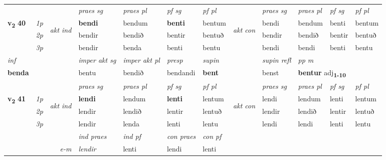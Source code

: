 \begin{longtable}[l]{X>{\footnotesize\itshape}llXXXXlXXXX}
 & &   & \textit{praes sg}  & \textit{praes pl}    & \textit{ pf sg} & \textit{pf pl} & & \textit{praes sg}  & \textit{praes pl}    & \textit{pf sg} & \textit{pf pl }  \\ \cmidrule{4-7} \cmidrule{9-12}
 \multirow{2}{*}{{{\textbf{v{\textsubscript{2}}} \Large{\textbf{40}}}}}  & 1p & \multirow{3}{*}{\begin{turn}{90}\textit{akt ind}\end{turn}} & \textbf{bendi} & bendum & \textbf{benti} & bentum & \multirow{3}{*}{\begin{turn}{90}\textit{akt con}\end{turn}} &bendi & bendum & benti & bentum\\*
 & 2p &  &  bendir  & bendið & bentir & bentuð & & bendir & bendið & bentir & bentuð \\*
 & 3p &  & bendir & benda & benti & bentu & & bendi & bendi& benti & bentu \\*
\cmidrule{4-7} \cmidrule{9-12}

   {\textit{inf}} & &  & \textit{imper akt sg} & \textit{imper akt pl}   & \textit{presp} & \textit{supin} && \textit{supin refl} & \textit{pp m} \\*
  {\textbf{benda}} & && bentu  & bendið   & bendandi &  \textbf{bent} && benst & \multicolumn{2}{l}{\textbf{bentur} adj\textbf{\textsubscript{1-10}}} \\*

\midrule

 & &   & \textit{praes sg}  & \textit{praes pl}    & \textit{ pf sg} & \textit{pf pl} & & \textit{praes sg}  & \textit{praes pl}    & \textit{pf sg} & \textit{pf pl }  \\ \cmidrule{4-7} \cmidrule{9-12}
 \multirow{2}{*}{{{\textbf{v{\textsubscript{2}}} \Large{\textbf{41}}}}}  & 1p & \multirow{3}{*}{\begin{turn}{90}\textit{akt ind}\end{turn}} & \textbf{lendi} & lendum & \textbf{lenti} & lentum & \multirow{3}{*}{\begin{turn}{90}\textit{akt con}\end{turn}} &lendi & lendum & lenti & lentum\\*
 & 2p &  &  lendir  & lendið & lentir & lentuð & & lendir & lendið & lentir & lentuð \\*
 & 3p &  & lendir & lenda & lenti & lentu & & lendi & lendi& lenti & lentu \\*
\cmidrule{4-7} \cmidrule{9-12}

   && &  \textit{ind praes} & \textit{ind pf} & \textit{con praes} & \textit{con pf} \\*
\multicolumn{3}{r}{\textit{e-m}} & lendir & lenti & lendi & lenti \\*


\end{longtable}
